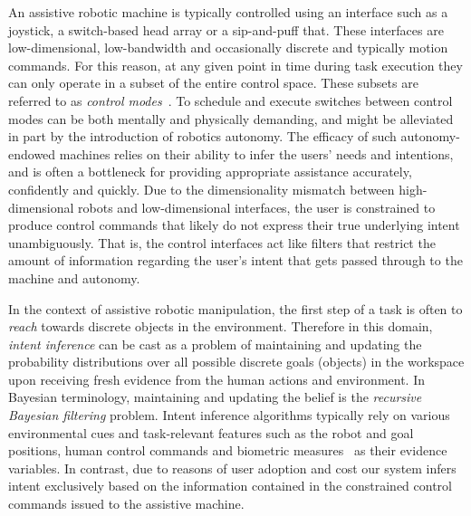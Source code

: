 \documentclass[conference]{IEEEtran}
\begin{document}
An assistive robotic machine is typically controlled using an interface such as a joystick, a switch-based head array or a sip-and-puff that. These interfaces are low-dimensional, low-bandwidth and occasionally discrete and typically motion commands. For this reason, at any given point in time during task execution they can only operate in a subset of the entire control space. These subsets are referred to as \textit{control modes}~\citep{simpson2008tooth}. To schedule and execute switches between control modes can be both mentally and physically demanding, and might be alleviated in part by the introduction of robotics autonomy. The efficacy of such autonomy-endowed machines relies on their ability to infer the users' needs and intentions, and is often a bottleneck for providing appropriate assistance accurately, confidently and quickly. Due to the dimensionality mismatch between high-dimensional robots and low-dimensional interfaces, the user is constrained to produce control commands that likely do not express their true underlying intent unambiguously. That is, the control interfaces act like filters that restrict the amount of information regarding the user's intent that gets passed through to the machine and autonomy. 

In the context of assistive robotic manipulation, the first step of a task is often to \textit{reach} towards discrete objects in the environment. Therefore in this domain, \textit{intent inference} can be cast as a problem of maintaining and updating the probability distributions over all possible discrete goals (objects) in the workspace upon receiving fresh evidence from the human actions and environment. In Bayesian terminology, maintaining and updating the belief is the \textit{recursive Bayesian filtering} problem. Intent inference algorithms typically rely on various environmental cues and task-relevant features such as the robot and goal positions, human control commands and biometric measures~\citep{croft2003estimating} as their evidence variables. In contrast, due to reasons of user adoption and cost our system infers intent exclusively based on the information contained in the constrained control commands issued to the assistive machine. 
\end{document}
